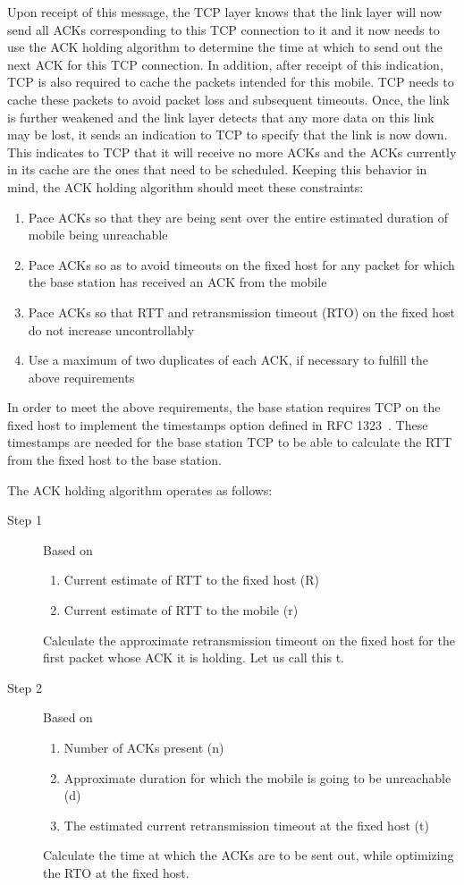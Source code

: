 \documentclass[conference]{IEEEtran}
\begin{document}
Upon receipt of this message, the TCP layer knows that the link layer will now send all ACKs corresponding to this TCP connection to it and it now needs to use the ACK holding algorithm to determine the time at which to send out the next ACK for this TCP connection. In addition, after receipt of this indication, TCP is also required to cache the packets intended for this mobile. TCP needs to cache these packets to avoid packet loss and subsequent timeouts. Once, the link is further weakened and the link layer detects that any more data on this link may be lost, it sends an indication to TCP to specify that the link is now down. This indicates to TCP that it will receive no more ACKs and the ACKs currently in its cache are the ones that need to be scheduled. Keeping this behavior in mind, the ACK holding algorithm should meet these constraints:
\begin{enumerate}
\item Pace ACKs so that they are being sent over the entire estimated duration of mobile being unreachable
\item Pace ACKs so as to avoid timeouts on the fixed host for any packet for which the base station has received an ACK from the mobile
\item Pace ACKs so that RTT and retransmission timeout (RTO) on the fixed host do not increase uncontrollably
\item Use a maximum of two duplicates of each ACK, if necessary to fulfill the above requirements
\end{enumerate}
In order to meet the above requirements, the base station requires TCP on the fixed host to implement the timestamps option defined in RFC 1323~\cite{Jacobson1992}. These timestamps are needed for the base station TCP to be able to calculate the RTT from the fixed host to the base station. 

\noindent The ACK holding algorithm operates as follows:
\begin{description}
\item[Step 1] Based on 
  \begin{enumerate}
  \item Current estimate of RTT to the fixed host (R)
  \item Current estimate of RTT to the mobile (r)
  \end{enumerate}
  Calculate the approximate retransmission timeout on the fixed host for the first packet whose ACK it is holding. Let us call this t.
\item[Step 2] Based on
  \begin{enumerate}
  \item Number of ACKs present (n)
  \item Approximate duration for which the mobile is going to be unreachable (d)
  \item The estimated current retransmission timeout at the fixed host (t)
  \end{enumerate}
  Calculate the time at which the ACKs are to be sent out, while optimizing the RTO at the fixed host.
\end{description}
\end{document}

